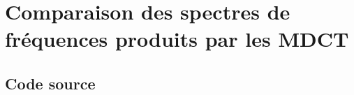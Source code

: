 \documentclass{article}
\begin{document}

\newpage
\section{Comparaison des spectres de fréquences produits par les MDCT}\label{app:spectrum_comparison}
\subsection{Code source}\label{app:spectrum_comparison_code}
\end{document}

